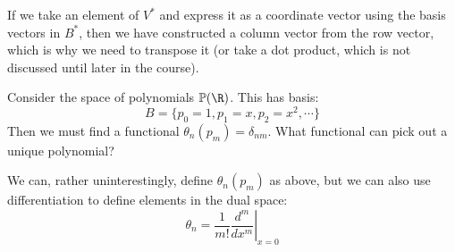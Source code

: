 \documentclass[../Main.tex]{subfiles}
\begin{document}
If we take an element of $V^*$ and express it as a coordinate vector using the basis vectors in $B^*$, then we have constructed a column vector from the row vector, which is why we need to transpose it (or take a dot product, which is not discussed until later in the course).
\begin{example}
    Consider the space of polynomials $\poly(\R)$. This has basis:
    \begin{equation*}
        B = \{p_0 = 1, p_1 = x, p_2 = x^2, \cdots\}
    \end{equation*}
    Then we must find a functional $\theta_n(p_m) = \delta_{nm}$. What functional can pick out a unique polynomial?

    We can, rather uninterestingly, define $\theta_n(p_m)$ as above, but we can also use differentiation to define elements in the dual space:
    \begin{equation*}
        \theta_n = \left.\frac{1}{m!}\frac{d^{m}}{dx^{m}}\right|_{x = 0}
    \end{equation*}
\end{example}
\end{document}
